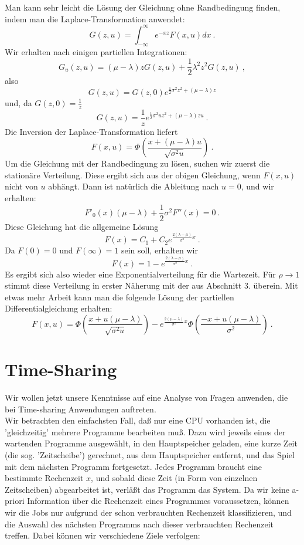 \begin{enumerate}
Man kann sehr leicht die Lösung der Gleichung ohne Randbedingung finden, indem man die Laplace-Transformation anwendet:
\[G(z,u)=\int_{-\infty}^{\infty} e^{-xz}F(x,u)dx ~.\]
Wir erhalten nach einigen partiellen Integrationen:
\[G_{u}(z,u) = (\mu-\lambda)zG(z,u)+\frac{1}{2}\lambda^{2}z^{2}G(z,u) ~, \]
also
\[ G(z,u) = G(z,0)e^{\frac{1}{2}\sigma^{2}z^{2}+(\mu - \lambda)z}  \]
und, da $G(z,0)=\frac{1}{z}$
\[G(z,u) = \frac{1}{z}e^{\frac{1}{2}\sigma^{2}uz^{2}+(\mu - \lambda)zu} ~.\]
Die Inversion der Laplace-Transformation liefert
\[F(x,u)=\Phi\left(\frac{x+(\mu - \lambda)u}{\sqrt{\sigma^{2}u}}\right) ~.  \]
Um die Gleichung mit der Randbedingung zu lösen, suchen wir zuerst die stationäre Verteilung. Diese ergibt sich aus der obigen Gleichung, wenn $F(x,u)$ nicht
von $u$ abhängt. Dann ist natürlich die Ableitung nach $u = 0$, und wir erhalten:
\[ F'_{0}(x)(\mu - \lambda)+\frac{1}{2}\sigma^{2}F''(x)=0 ~. \]
Diese Gleichung hat die allgemeine Lösung
\[F(x) = C_{1}+C_{2}e^{\frac{2(\lambda - \mu)}{\sigma^{2}}x} ~. \]
Da $F(0) = 0$ und $F(\infty) = 1$ sein soll, erhalten wir
\[F(x) = 1-e^{\frac{2(\lambda - \mu)}{\sigma^{2}}x} ~.  \]
Es ergibt sich also wieder eine Exponentialverteilung für die Wartezeit. Für $\rho \rightarrow 1$ stimmt diese Verteilung in erster Näherung mit der aus
Abschnitt $3.$ überein. Mit etwas mehr Arbeit kann man die folgende Lösung der partiellen Differentialgleichung erhalten:
\[F(x,u)=\Phi\left(\frac{x+u(\mu - \lambda)}{\sqrt{\sigma^{2}u}}\right)-e^{\frac{2(\mu - \lambda)}{\sigma^{2}}x}\Phi\left(\frac{-x+u(\mu -
\lambda)}{\sigma^{2}}\right) ~.\]
\end {enumerate}
\chapter{Time-Sharing}
Wir wollen jetzt unsere Kenntnisse auf eine Analyse von Fragen anwenden, die bei Time-sharing Anwendungen auftreten. \\
Wir betrachten den einfachsten Fall, daß nur eine CPU vorhanden ist, die 'gleichzeitig' mehrere Programme bearbeiten muß.
Dazu wird jeweils eines der wartenden Programme ausgewählt, in den Hauptspeicher geladen, eine kurze Zeit (die sog. 'Zeitscheibe') gerechnet,
aus dem
Hauptspeicher entfernt, und das Spiel mit dem nächsten Programm fortgesetzt. Jedes Programm braucht eine bestimmte Rechenzeit $x$, und sobald
diese Zeit (in
Form von einzelnen Zeitscheiben) abgearbeitet ist, verläßt das Programm das System. Da wir keine a-priori Information über die Rechenzeit eines Programmes
voraussetzen, können wir die Jobs nur aufgrund der schon verbrauchten Rechenzeit klassifizieren, und die Auswahl des nächsten Programms nach dieser verbrauchten
Rechenzeit treffen. Dabei können wir verschiedene Ziele verfolgen:


